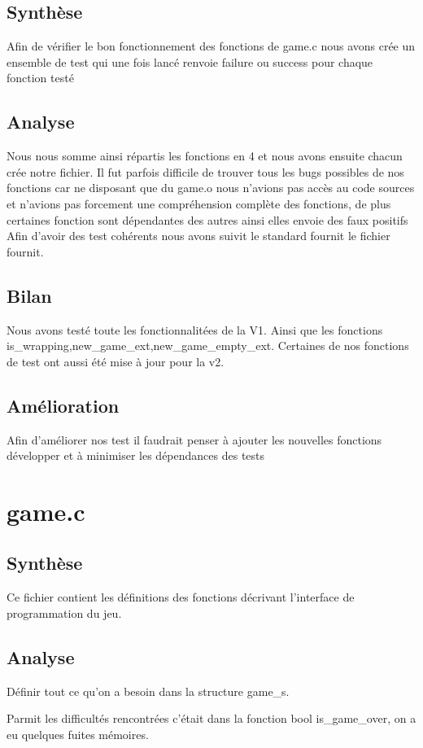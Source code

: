 \documentclass[12pt]{article}
\begin{document}
\subsection{Synthèse}
Afin de vérifier le bon fonctionnement des fonctions de game.c nous avons crée un ensemble de test qui une fois lancé renvoie failure ou success 
pour chaque fonction testé
\subsection{Analyse}
Nous nous somme ainsi répartis les fonctions en 4 et nous avons ensuite chacun crée notre fichier.
Il fut parfois difficile de trouver tous les bugs possibles de nos fonctions car ne disposant que du game.o
nous n'avions pas accès au code sources et n'avions pas forcement une compréhension complète des fonctions, 
de plus certaines fonction sont dépendantes des autres ainsi elles envoie des faux positifs
Afin d'avoir des test cohérents nous avons suivit le standard fournit le fichier fournit.
\subsection{Bilan}
Nous avons testé toute les fonctionnalitées de la V1. Ainsi que les fonctions is\_wrapping,new\_game\_ext,new\_game\_empty\_ext.
Certaines de nos fonctions de test ont aussi été mise à jour pour la v2.
\subsection{Amélioration}
Afin d'améliorer nos test il faudrait penser à ajouter les nouvelles fonctions développer et à minimiser les dépendances des tests



\section{game.c}
\subsection{Synthèse}
Ce fichier contient les définitions des fonctions décrivant l'interface de programmation du jeu.
\subsection{Analyse}
Définir tout ce qu'on a besoin dans la structure game\_s.

Parmit les difficultés rencontrées c'était dans la fonction bool is\_game\_over, on a eu quelques fuites mémoires.
\end{document}
